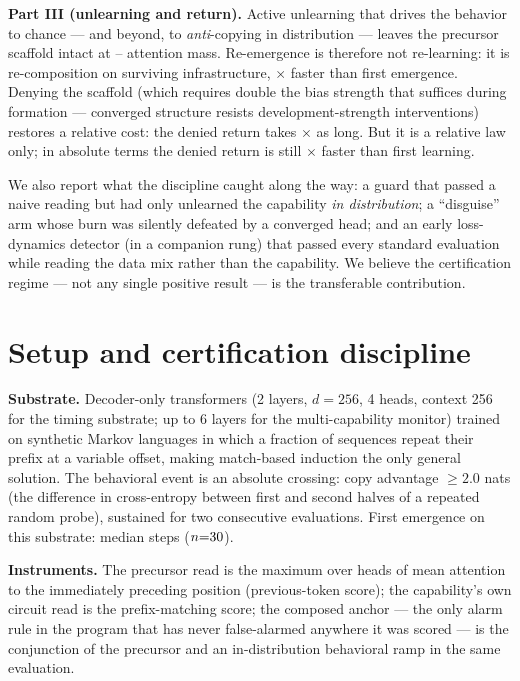 \documentclass[11pt]{article}
\begin{document}
\textbf{Part III (unlearning and return).} Active unlearning that drives the behavior
to chance --- and beyond, to \emph{anti}-copying in distribution --- leaves the
precursor scaffold intact at \RtwoScaffoldLo--\RtwoScaffoldHi{} attention mass.
Re-emergence is therefore not re-learning: it is re-composition on surviving
infrastructure, \RtwoRelearnX$\times$ faster than first emergence. Denying the
scaffold (which requires double the bias strength that suffices during formation ---
converged structure resists development-strength interventions) restores a relative
cost: the denied return takes \RtwoBRatio$\times$ as long. But it is a relative law
only; in absolute terms the denied return is still \RtwoBDeniedVsFirstX$\times$
faster than first learning.

We also report what the discipline caught along the way: a guard that passed a naive
reading but had only unlearned the capability \emph{in distribution}; a ``disguise''
arm whose burn was silently defeated by a converged head; and an early loss-dynamics
detector (in a companion rung) that passed every standard evaluation while reading the
data mix rather than the capability. We believe the certification regime --- not any
single positive result --- is the transferable contribution.

\section{Setup and certification discipline}
\label{sec:setup}
\textbf{Substrate.} Decoder-only transformers (2 layers, $d{=}256$, 4 heads, context
256 for the timing substrate; up to 6 layers for the multi-capability monitor) trained
on synthetic Markov languages in which a fraction of sequences repeat their prefix at a
variable offset, making match-based induction the only general solution. The
behavioral event is an absolute crossing: copy advantage $\ge 2.0$ nats (the
difference in cross-entropy between first and second halves of a repeated random
probe), sustained for two consecutive evaluations. First emergence on this substrate:
median \PsevenTzero{} steps ($n{=}30$).

\textbf{Instruments.} The precursor read is the maximum over heads of mean attention
to the immediately preceding position (previous-token score); the capability's own
circuit read is the prefix-matching score; the composed anchor --- the only alarm rule
in the program that has never false-alarmed anywhere it was scored --- is the
conjunction of the precursor and an in-distribution behavioral ramp in the same
evaluation.
\end{document}
